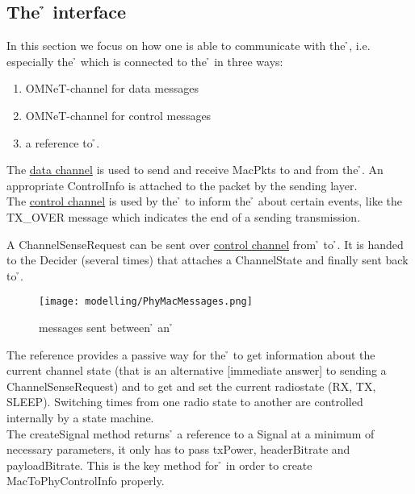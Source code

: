 \subsection{The \h{\bp} interface}

In this section we focus on how one is able to communicate with the 
\h{\bp}, i.e. especially the \h{\bm} which is connected to the \h{\bp}
in three ways:

\begin{enumerate}
 \item OMNeT-channel for data messages
 \item OMNeT-channel for control messages
 \item a reference to \h{\bp}.
\end{enumerate} 

The \underline{data channel} is used to send and receive
MacPkts to and
from the \h{\bp}. An appropriate ControlInfo is attached to the packet by the
sending layer. \\

The \underline{control channel} is used by the \h{\bp} to inform the \h{\bm}
about
certain events, like the TX\_OVER message 
which indicates the end of a sending transmission.

A ChannelSenseRequest can be sent over \underline{control channel} from \h{\bm}
to \h{\bp}. It is handed to the Decider (several times) that attaches a
ChannelState and finally sent back to \h{\bm}.
\begin{figure}[H]
 \centering
 \texttt{[image: modelling/PhyMacMessages.png]}
 \caption{messages sent between \h{\bp} an \h{\bm}}
 \label{fig: PhyMacMessages}
\end{figure}


The reference provides a passive way for the  \h{\bm} to 
get
information about the current channel state (that is an
alternative [immediate answer] to sending a ChannelSenseRequest) and to
get and set the current radiostate (RX,
TX,
SLEEP).
Switching times from one radio state to another are
controlled
internally by a state machine. 
\\

The createSignal method returns \h{\bm} a reference to a Signal at a minimum of
necessary parameters, it only has to pass txPower, headerBitrate and
payloadBitrate. This is the key method for \h{\bm} in order to create
MacToPhyControlInfo properly.

